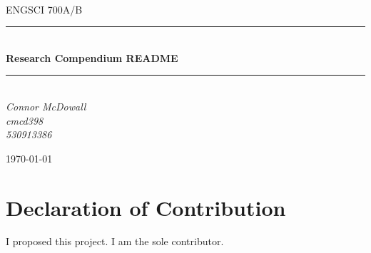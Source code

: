 \documentclass[12pt]{article}
\begin{document}
\begin{titlepage}
	\newcommand{\HRule}{\rule{\linewidth}{0.5mm}} %
	
	\center
	
	
	\textsc{\LARGE }\\[1.5cm] %
	
	\textsc{\Large ENGSCI 700A/B}\\[0.5cm] %
	
	
	\HRule\\[0.5cm]
	
	{\huge\bfseries Research Compendium README}\\[0.4cm] %
	
	\HRule\\[0.5cm]
	
	
	{\large\textit{Connor McDowall \\cmcd398 \\530913386}}\\
	
	
	\vfill\vfill\vfill %
	
	{\large\today} %
	 
	
	\vfill %
	
\end{titlepage}
\section*{Declaration of Contribution}
I proposed this project. I am the sole contributor.
\end{document}
